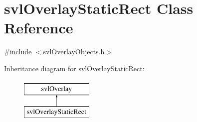 \hypertarget{classsvl_overlay_static_rect}{}\section{svl\+Overlay\+Static\+Rect Class Reference}
\label{classsvl_overlay_static_rect}


{\ttfamily \#include $<$svl\+Overlay\+Objects.\+h$>$}

Inheritance diagram for svl\+Overlay\+Static\+Rect\+:\begin{figure}[H]
\begin{center}
\leavevmode
\includegraphics[height=2.000000cm]{d9/d51/classsvl_overlay_static_rect}
\end{center}
\end{figure}
